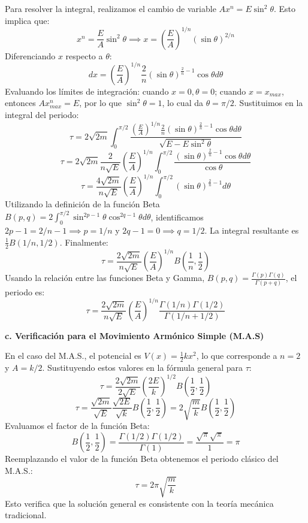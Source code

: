 \documentclass[a4paper]{article}
\begin{document}
Para resolver la integral, realizamos el cambio de variable $Ax^n = E \sin^2 \theta$. Esto implica que:
$$x^n = \frac{E}{A} \sin^2 \theta \implies x = \left(\frac{E}{A}\right)^{1/n} (\sin \theta)^{2/n}$$
Diferenciando $x$ respecto a $\theta$:
$$dx = \left(\frac{E}{A}\right)^{1/n} \frac{2}{n} (\sin \theta)^{\frac{2}{n} - 1} \cos \theta d\theta$$
Evaluando los límites de integración: cuando $x=0, \theta=0$; cuando $x=x_{max}$, entonces $Ax_{max}^n = E$, por lo que $\sin^2 \theta = 1$, lo cual da $\theta = \pi/2$. Sustituimos en la integral del periodo:
$$\tau = 2\sqrt{2m} \int_{0}^{\pi/2} \frac{\left(\frac{E}{A}\right)^{1/n} \frac{2}{n} (\sin \theta)^{\frac{2}{n} - 1} \cos \theta d\theta}{\sqrt{E - E \sin^2 \theta}}$$
$$\tau = 2\sqrt{2m} \frac{2}{n\sqrt{E}} \left(\frac{E}{A}\right)^{1/n} \int_{0}^{\pi/2} \frac{(\sin \theta)^{\frac{2}{n} - 1} \cos \theta d\theta}{\cos \theta}$$
$$\tau = \frac{4\sqrt{2m}}{n\sqrt{E}} \left(\frac{E}{A}\right)^{1/n} \int_{0}^{\pi/2} (\sin \theta)^{\frac{2}{n} - 1} d\theta$$
Utilizando la definición de la función Beta $B(p, q) = 2 \int_{0}^{\pi/2} \sin^{2p-1} \theta \cos^{2q-1} \theta d\theta$, identificamos $2p-1 = 2/n - 1 \implies p = 1/n$ y $2q-1 = 0 \implies q = 1/2$. La integral resultante es $\frac{1}{2} B(1/n, 1/2)$. Finalmente:
$$\tau = \frac{2\sqrt{2m}}{n\sqrt{E}} \left(\frac{E}{A}\right)^{1/n} B\left(\frac{1}{n}, \frac{1}{2}\right)$$
Usando la relación entre las funciones Beta y Gamma, $B(p, q) = \frac{\Gamma(p)\Gamma(q)}{\Gamma(p+q)}$, el periodo es:
$$\tau = \frac{2\sqrt{2m}}{n\sqrt{E}} \left(\frac{E}{A}\right)^{1/n} \frac{\Gamma(1/n)\Gamma(1/2)}{\Gamma(1/n + 1/2)}$$

\textbf{c. Verificación para el Movimiento Armónico Simple (M.A.S)}

En el caso del M.A.S., el potencial es $V(x) = \frac{1}{2}kx^2$, lo que corresponde a $n=2$ y $A=k/2$. Sustituyendo estos valores en la fórmula general para $\tau$:
$$\tau = \frac{2\sqrt{2m}}{2\sqrt{E}} \left(\frac{2E}{k}\right)^{1/2} B\left(\frac{1}{2}, \frac{1}{2}\right)$$
$$\tau = \frac{\sqrt{2m}}{\sqrt{E}} \frac{\sqrt{2E}}{\sqrt{k}} B\left(\frac{1}{2}, \frac{1}{2}\right) = 2 \sqrt{\frac{m}{k}} B\left(\frac{1}{2}, \frac{1}{2}\right)$$
Evaluamos el factor de la función Beta:
$$B\left(\frac{1}{2}, \frac{1}{2}\right) = \frac{\Gamma(1/2)\Gamma(1/2)}{\Gamma(1)} = \frac{\sqrt{\pi}\sqrt{\pi}}{1} = \pi$$
Reemplazando el valor de la función Beta obtenemos el periodo clásico del M.A.S.:
$$\tau = 2\pi \sqrt{\frac{m}{k}}$$
Esto verifica que la solución general es consistente con la teoría mecánica tradicional.
\end{document}

